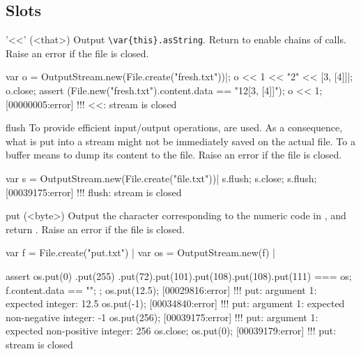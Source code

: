 \subsection{Slots}

\begin{urbiscriptapi}
\item['<<'](<that>)%
  Output \lstinline|\var{this}.asString|.  Return \this to enable chains of
  calls.  Raise an error if the file is closed.
\begin{urbiscript}
var o = OutputStream.new(File.create("fresh.txt"))|;
o << 1 << "2" << [3, [4]]|;
o.close;
assert (File.new("fresh.txt").content.data == "12[3, [4]]");
o << 1;
[00000005:error] !!! <<: stream is closed
\end{urbiscript}


\item[flush]%
  To provide efficient input/output operations,  are
  used.  As a consequence, what is put into a stream might not be
  immediately saved on the actual file.  To  a buffer means to
  dump its content to the file.  Raise an error if the file is closed.
\begin{urbiscript}
var s = OutputStream.new(File.create("file.txt"))|
s.flush;
s.close;
s.flush;
[00039175:error] !!! flush: stream is closed
\end{urbiscript}


\item[put](<byte>)%
  Output the character corresponding to the numeric code  in
  \this, and return \this.  Raise an error if the file is closed.
\begin{urbiscript}
var f = File.create("put.txt") |
var os = OutputStream.new(f) |

assert
{
  os.put(0)
    .put(255)
    .put(72).put(101).put(108).put(108).put(111)
  === os;
  f.content.data == "\0\xffHello";
};
os.put(12.5);
[00029816:error] !!! put: argument 1: expected integer: 12.5
os.put(-1);
[00034840:error] !!! put: argument 1: expected non-negative integer: -1
os.put(256);
[00039175:error] !!! put: argument 1: expected non-positive integer: 256
os.close;
os.put(0);
[00039179:error] !!! put: stream is closed
\end{urbiscript}
\end{urbiscriptapi}


